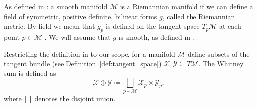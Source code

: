 \begin{definition}\label{def:riemannian_manifold}
    As defined in \cite[def~2.6,~p.~179]{Boothby1975}: a smooth manifold $\mathcal{M}$ is a \textup{Riemannian manifold} if we can define a field of symmetric, positive definite, bilinear forms $g$, called the \textup{Riemannian metric}. By field we mean that $g_p$ is defined on the tangent space $T_p\mathcal{M}$ at each point $p\in \mathcal{M}$ \cite[def~2.1,~p.~178]{Boothby1975}. We will assume that $g$ is smooth, as defined in \cite[Def.~3.1,~p~65]{Boothby1975}.
\end{definition}


\begin{definition}\label{def:Whitney_sum}
    Restricting the definition in \cite[p.114]{Bourles2019} to our scope, for a manifold $\mathcal{M}$ define subsets of the tangent bundle (see Definition~\ref{def:tangent_space}) $\mathcal{X},\mathcal{Y}\subseteq T\mathcal{M}$. The Whitney sum is defined as 
    \begin{equation*}
        \mathcal{X}\oplus \mathcal{Y}\coloneqq\bigsqcup_{p\in \mathcal{M}}\mathcal{X}_{p}\times \mathcal{Y}_{p},
    \end{equation*}
    where $\bigsqcup$ denotes the disjoint union. 
\end{definition}

